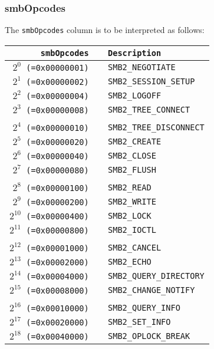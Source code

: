 \documentclass[documentation]{subfiles}
\begin{document}
\subsubsection{smbOpcodes}\label{smbOpcodes}
The {\tt smbOpcodes} column is to be interpreted as follows:
\begin{longtable}{>{\tt}r>{\tt}l}
    \toprule
    {\bf smbOpcodes} & {\bf Description}\\
    \midrule\endhead%
    $2^{0}$  (=0x00000001) & SMB2\_NEGOTIATE\\
    $2^{1}$  (=0x00000002) & SMB2\_SESSION\_SETUP\\
    $2^{2}$  (=0x00000004) & SMB2\_LOGOFF\\
    $2^{3}$  (=0x00000008) & SMB2\_TREE\_CONNECT\\
    \\
    $2^{4}$  (=0x00000010) & SMB2\_TREE\_DISCONNECT\\
    $2^{5}$  (=0x00000020) & SMB2\_CREATE\\
    $2^{6}$  (=0x00000040) & SMB2\_CLOSE\\
    $2^{7}$  (=0x00000080) & SMB2\_FLUSH\\
    \\
    $2^{8}$  (=0x00000100) & SMB2\_READ\\
    $2^{9}$  (=0x00000200) & SMB2\_WRITE\\
    $2^{10}$ (=0x00000400) & SMB2\_LOCK\\
    $2^{11}$ (=0x00000800) & SMB2\_IOCTL\\
    \\
    $2^{12}$ (=0x00001000) & SMB2\_CANCEL\\
    $2^{13}$ (=0x00002000) & SMB2\_ECHO\\
    $2^{14}$ (=0x00004000) & SMB2\_QUERY\_DIRECTORY\\
    $2^{15}$ (=0x00008000) & SMB2\_CHANGE\_NOTIFY\\
    \\
    $2^{16}$ (=0x00010000) & SMB2\_QUERY\_INFO\\
    $2^{17}$ (=0x00020000) & SMB2\_SET\_INFO\\
    $2^{18}$ (=0x00040000) & SMB2\_OPLOCK\_BREAK\\
    \bottomrule
\end{longtable}
\end{document}
